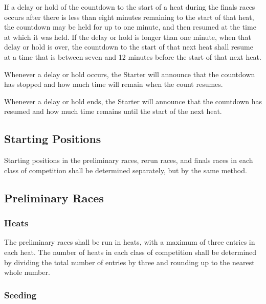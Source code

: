 	If a delay or hold of the countdown to the start of a heat during the finals
	races occurs after there is less than eight minutes remaining to the start of
	that heat, the countdown may be held for up to one minute, and then resumed at
	the time at which it was held. If the delay or hold is longer than one minute,
	when that delay or hold is over, the countdown to the start of that next heat
	shall resume at a time that is between seven and 12 minutes before the start of
	that next heat.

	Whenever a delay or hold occurs, the Starter will announce that the countdown
	has stopped and how much time will remain when the count resumes.

	Whenever a delay or hold ends, the Starter will announce that the countdown has
	resumed and how much time remains until the start of the next heat.

\subsection{Starting Positions}

	Starting positions in the preliminary races, rerun races, and finals races in
	each class of competition shall be determined separately, but by the same
	method.

\subsection{Preliminary Races}

\subsubsection{Heats}

	The preliminary races shall be run in heats, with a maximum of three entries in
	each heat. The number of heats in each class of competition shall be determined
	by dividing the total number of entries by three and rounding up to the nearest
	whole number.

\subsubsection{Seeding}

